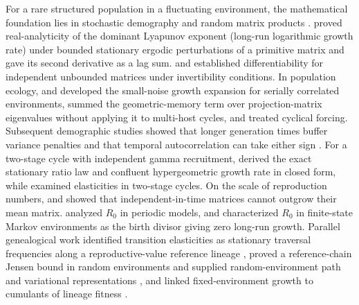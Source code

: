 For a rare structured population in a fluctuating environment, the mathematical foundation lies in stochastic demography and random matrix products \citep{furstenberg1960,cohen1979b,tuljapurkar1990}. \citet{ruelle1979} proved real-analyticity of the dominant Lyapunov exponent (long-run logarithmic growth rate) under bounded stationary ergodic perturbations of a primitive matrix and gave its second derivative as a lag sum. \citet{lepage1989} and \citet{hennion1991} established differentiability for independent unbounded matrices under invertibility conditions. In population ecology, \citet{tuljapurkar1982a} and \citet{tuljapurkar2006} developed the small-noise growth expansion for serially correlated environments, \citet{tuljapurkar1982b} summed the geometric-memory term over projection-matrix eigenvalues without applying it to multi-host cycles, and \citet{tuljapurkar1985} treated cyclical forcing. Subsequent demographic studies showed that longer generation times buffer variance penalties and that temporal autocorrelation can take either sign \citep{lande1988,orzack1989,morris2008,tuljapurkar2009,engen2013,monmarche2025}. For a two-stage cycle with independent gamma recruitment, \citet{roerdink1988,roerdink1989a} derived the exact stationary ratio law and confluent hypergeometric growth rate in closed form, while \citet{jonsson2021} examined elasticities in two-stage cycles. On the scale of reproduction numbers, \citet{cohen1979b} and \citet{tuljapurkar1990} showed that independent-in-time matrices cannot outgrow their mean matrix. \citet{bacaer2007,bacaer2009} analyzed $R_0$ in periodic models, and \citet{bacaer2013} characterized $R_0$ in finite-state Markov environments as the birth divisor giving zero long-run growth. Parallel genealogical work identified transition elasticities as stationary traversal frequencies along a reproductive-value reference lineage \citep{vangroenendael1994,georgii2003,baake2007,bienvenu2015,bienvenu2017}, proved a reference-chain Jensen bound in random environments \citep{dombry2011} and supplied random-environment path and variational representations \citep{kobayashi2015,kobayashi2017}, and linked fixed-environment growth to cumulants of lineage fitness \citep{nozoe2017,levien2020a,genthon2021,yamauchi2022}.

